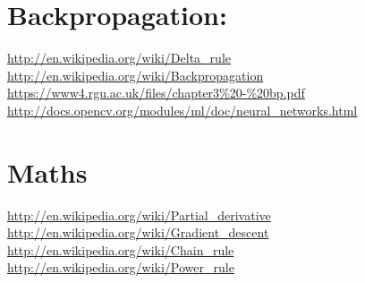 \documentclass[12pt, right open]{memoir}
\begin{document}
\section{Backpropagation:}
\url{http://en.wikipedia.org/wiki/Delta_rule} \\
\url{http://en.wikipedia.org/wiki/Backpropagation} \\ 
\url{https://www4.rgu.ac.uk/files/chapter3\%20-\%20bp.pdf} \\ 
\url{http://docs.opencv.org/modules/ml/doc/neural_networks.html} \\ 


\section{Maths}
\url{http://en.wikipedia.org/wiki/Partial_derivative} \\
\url{http://en.wikipedia.org/wiki/Gradient_descent} \\
\url{http://en.wikipedia.org/wiki/Chain_rule} \\
\url{http://en.wikipedia.org/wiki/Power_rule} \\
\end{document}
